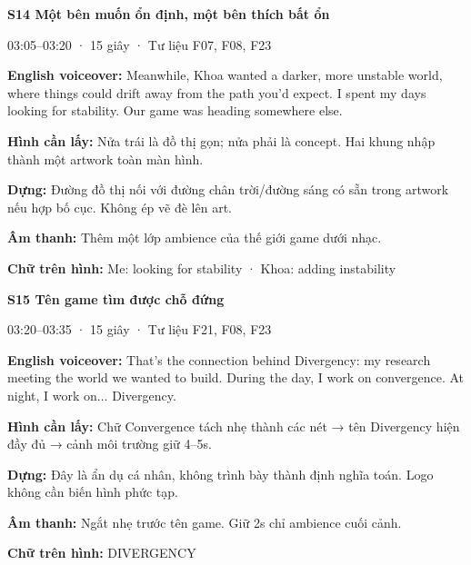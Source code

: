 \documentclass[10pt,a4paper]{article}
\begin{document}
\textbf{S14 Một bên muốn ổn định, một bên thích bất ổn}\par

03:05–03:20 · 15 giây · Tư liệu F07, F08, F23\par

\textbf{English voiceover:}  Meanwhile, Khoa wanted a darker, more unstable world, where things could drift away from the path you’d expect. I spent my days looking for stability. Our game was heading somewhere else.\par

\textbf{Hình cần lấy:}  Nửa trái là đồ thị gọn; nửa phải là concept. Hai khung nhập thành một artwork toàn màn hình.\par

\textbf{Dựng:}  Đường đồ thị nối với đường chân trời/đường sáng có sẵn trong artwork nếu hợp bố cục. Không ép vẽ đè lên art.\par

\textbf{Âm thanh:}  Thêm một lớp ambience của thế giới game dưới nhạc.\par

\textbf{Chữ trên hình:}  Me: looking for stability · Khoa: adding instability\par

\textbf{S15 Tên game tìm được chỗ đứng}\par

03:20–03:35 · 15 giây · Tư liệu F21, F08, F23\par

\textbf{English voiceover:}  That’s the connection behind Divergency: my research meeting the world we wanted to build. During the day, I work on convergence. At night, I work on... Divergency.\par

\textbf{Hình cần lấy:}  Chữ Convergence tách nhẹ thành các nét → tên Divergency hiện đầy đủ → cảnh môi trường giữ 4–5s.\par

\textbf{Dựng:}  Đây là ẩn dụ cá nhân, không trình bày thành định nghĩa toán. Logo không cần biến hình phức tạp.\par

\textbf{Âm thanh:}  Ngắt nhẹ trước tên game. Giữ 2s chỉ ambience cuối cảnh.\par

\textbf{Chữ trên hình:}  DIVERGENCY\par

\clearpage
\end{document}

